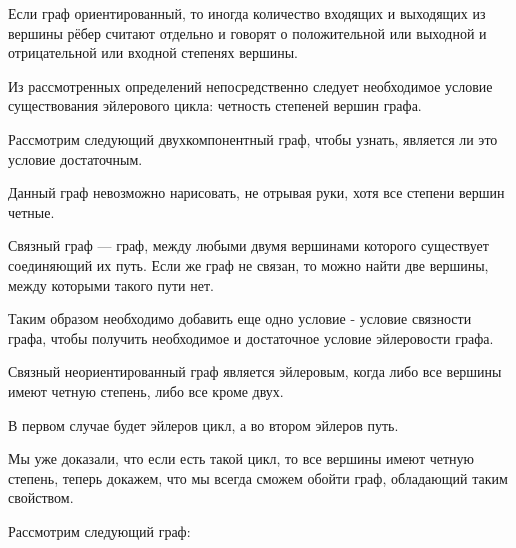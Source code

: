 \documentclass[russian]{lecture-notes}
\begin{document}
\begin{note}
    Если граф ориентированный, то иногда количество входящих и выходящих из вершины рёбер считают отдельно и говорят о положительной или выходной и отрицательной или входной степенях вершины.
\end{note}

Из рассмотренных определений непосредственно следует необходимое условие существования эйлерового цикла: четность степеней вершин графа. 

Рассмотрим следующий двухкомпонентный граф, чтобы узнать, является ли это условие достаточным.

\begin{figure}[H]
    \centering
\end{figure}

Данный граф невозможно нарисовать, не отрывая руки, хотя все степени вершин четные.

\begin{definition}
    Связный граф — граф, между любыми двумя вершинами которого существует соединяющий их путь. Если же граф не связан, то можно найти две вершины, между которыми такого пути нет. 
\end{definition}

Таким образом необходимо добавить еще одно условие - условие связности графа, чтобы получить необходимое и достаточное условие эйлеровости графа.

\begin{theorem}
Связный неориентированный граф является эйлеровым, когда либо все вершины имеют четную степень, либо все кроме двух.
\end{theorem}

\begin{note}
    В первом случае будет эйлеров цикл, а во втором эйлеров путь.
\end{note}

Мы уже доказали, что если есть такой цикл, то все вершины имеют четную степень, теперь докажем, что мы всегда сможем обойти граф, обладающий таким свойством.

Рассмотрим следующий граф:
\end{document}
